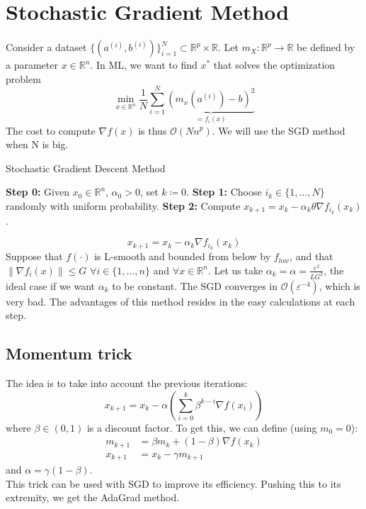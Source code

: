 \documentclass[12pt, openany]{report}
\newcommand{\R}{\mathbb{R}}
\theoremstyle{definition}
\begin{document}
\section{Stochastic Gradient Method}
Consider a dataset \(\{(a^{(i)},b^{(i)})\}_{i=1}^N\subset \R^p\times \R\). Let \(m_X:\R^p\rightarrow \R\) be defined by a parameter \(x\in \R^n\). In ML, we want to find \(x^*\) that solves the optimization problem
\begin{equation}
    \min_{x\in \R^n}\frac{1}{N}\sum_{i=1}^N \underbrace{\left(m_x\left(a^{(i)}\right)-b\right)^2}_{=f_i(x)}
\end{equation}
The cost to compute \(\nabla f(x)\) is thus \(\mathcal{O}(Nn^p)\). We will use the SGD method when N is big.
\begin{algorithm}
    \caption{Stochastic Gradient Descent Method}\label{algo:SGD}
    \begin{algorithmic}[1]
        \State \textbf{Step 0:} Given \(x_0\in \R^n\), \(\alpha_0>0\), set \(k\coloneqq 0\).
        \State \textbf{Step 1:} Choose \(i_k\in \{1,\dots,N\}\) randomly with uniform probability.
        \State \textbf{Step 2:} Compute \(x_{k+1}=x_k-\alpha_k \theta \nabla f_{i_k}(x_k)\).
    \end{algorithmic}
\end{algorithm}
\begin{equation}
    x_{k+1} = x_k-\alpha_k \nabla f_{i_k}(x_k)
\end{equation}
Suppose that $f(\cdot)$ is L-smooth and bounded from below by $f_{low}$, and that $\lVert \nabla f_i(x)\rVert \le G$ $\forall i\in \{1,\dots,n\}$ and $\forall x \in \R^n$. Let us take $\alpha_k = \alpha = \frac{\varepsilon^2}{LG^2}$, the ideal case if we want $\alpha_k$ to be constant. The SGD converges in $\mathcal{O}(\varepsilon^{-4})$, which is very bad. The advantages of this method resides in the easy calculations at each step. 
\subsection{Momentum trick}
The idea is to take into account the previous iterations:
\begin{equation}
    x_{k+1} = x_k - \alpha \left(\sum_{i=0}^k \beta^{k-i}\nabla f(x_i)\right)
\end{equation}
where $\beta \in (0,1)$ is a discount factor. To get this, we can define (using $m_0=0$):
\begin{align}
    m_{k+1}&=\beta m_k + (1-\beta)\nabla f(x_k)\nonumber\\
    x_{k+1}&= x_k - \gamma m_{k+1}
\end{align}
and $\alpha = \gamma(1-\beta)$.\\
This trick can be used with SGD to improve its efficiency. Pushing this to its extremity, we get the AdaGrad method.
\end{document}

